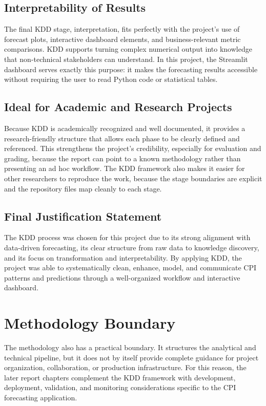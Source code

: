 \subsection{Interpretability of Results}

The final KDD stage, interpretation, fits perfectly with the project's use of forecast plots, interactive dashboard elements, and business-relevant metric comparisons. KDD supports turning complex numerical output into knowledge that non-technical stakeholders can understand. In this project, the Streamlit dashboard serves exactly this purpose: it makes the forecasting results accessible without requiring the user to read Python code or statistical tables.

\subsection{Ideal for Academic and Research Projects}

Because KDD is academically recognized and well documented, it provides a research-friendly structure that allows each phase to be clearly defined and referenced. This strengthens the project's credibility, especially for evaluation and grading, because the report can point to a known methodology rather than presenting an ad hoc workflow. The KDD framework also makes it easier for other researchers to reproduce the work, because the stage boundaries are explicit and the repository files map cleanly to each stage.

\subsection{Final Justification Statement}

The KDD process was chosen for this project due to its strong alignment with data-driven forecasting, its clear structure from raw data to knowledge discovery, and its focus on transformation and interpretability. By applying KDD, the project was able to systematically clean, enhance, model, and communicate CPI patterns and predictions through a well-organized workflow and interactive dashboard.

\section{Methodology Boundary}

The methodology also has a practical boundary. It structures the analytical and technical pipeline, but it does not by itself provide complete guidance for project organization, collaboration, or production infrastructure. For this reason, the later report chapters complement the KDD framework with development, deployment, validation, and monitoring considerations specific to the CPI forecasting application.
